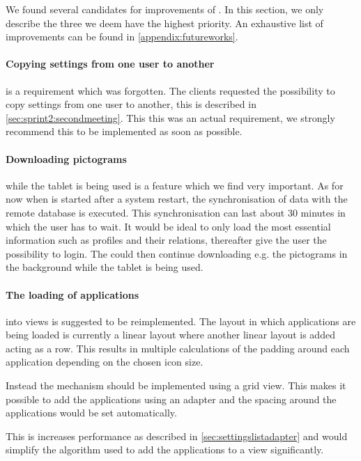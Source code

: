 We found several candidates for improvements of \launcher.
In this section, we only describe the three we deem have the highest priority.
An exhaustive list of improvements can be found in \cref{appendix:futureworks}.

\paragraph{Copying settings from one user to another} is a requirement which was forgotten.
The clients requested the possibility to copy settings from one user to another, this is described in \cref{sec:sprint2:secondmeeting}.
This this was an actual requirement, we strongly recommend this to be implemented as soon as possible.

\paragraph{Downloading pictograms} while the tablet is being used is a feature which we find very important.
As for now when \launcher is started after a system restart, the synchronisation of data with the remote database is executed.
This synchronisation can last about 30 minutes in which the user has to wait.
It would be ideal to only load the most essential information such as profiles and their relations, thereafter give the user the possibility to login.
The \launcher could then continue downloading e.g. the pictograms in the background while the tablet is being used.

\paragraph{The loading of applications} into views is suggested to be reimplemented. 
The layout in which applications are being loaded is currently a linear layout where another linear layout is added acting as a row.
This results in multiple calculations of the padding around each application depending on the chosen icon size.

Instead the mechanism should be implemented using a grid view.
This makes it possible to add the applications using an adapter and the spacing around the applications would be set automatically.

This is increases performance as described in \cref{sec:settingslistadapter} and would simplify the algorithm used to add the applications to a view significantly.